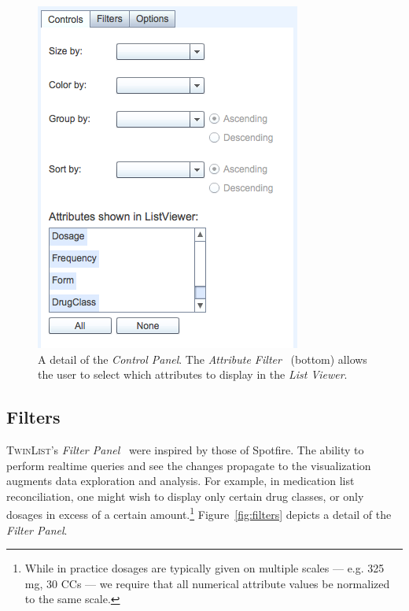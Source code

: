 \documentclass{chi2009}
\newcommand{\TwinList}{\textsc{TwinList}}
\newcommand{\ListViewer}{\textit{List Viewer}}
\newcommand{\Controls}{\textit{Control Panel}}
\newcommand{\Filters}{\textit{Filter Panel}}
\newcommand{\AttributeFilter}{\textit{Attribute Filter}}
\begin{document}
\begin{figure}[t]
\begin{center}
\includegraphics[width=1\linewidth]{img/controls2.png}
\end{center}
   \caption{A detail of the \Controls. The \AttributeFilter~ (bottom) allows the user to select which attributes to display in the \ListViewer.}
   \label{fig:controls}
\end{figure}

\subsection{Filters}
\TwinList's \Filters~ were inspired by those of Spotfire\cite{Ahlberg1996}. The ability to perform realtime queries and see the changes propagate to the visualization augments data exploration and analysis. For example, in medication list reconciliation, one might wish to display only certain drug classes, or only dosages in excess of a certain amount.\footnote{While in practice dosages are typically given on multiple scales --- e.g. 325 mg, 30 CCs --- we require that all numerical attribute values be normalized to the same scale.} Figure~\ref{fig:filters} depicts a detail of the \Filters.
\end{document}
